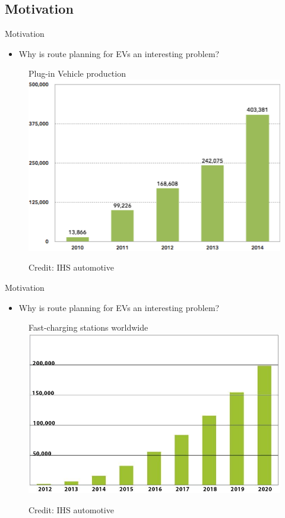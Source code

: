 \subsection{Motivation}
\begin{frame}{Motivation}
\begin{itemize}
\item Why is route planning for EVs an interesting problem?
\end{itemize}
\begin{figure}[h!]
  \centering
  Plug-in Vehicle production
    \includegraphics[height=0.5\textwidth]{forecast}
  
      \tiny Credit: IHS automotive
\end{figure}

\end{frame}
\begin{frame}{Motivation}
\begin{itemize}
\item Why is route planning for EVs an interesting problem?
\end{itemize}
\begin{figure}[h!]
  \centering
  Fast-charging stations worldwide
    \includegraphics[height=0.5\textwidth]{forecast2}
  
      \tiny Credit: IHS automotive
\end{figure}
\end{frame}
